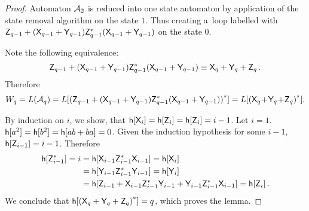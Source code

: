 \begin{proof}
    Automaton ${\mathcal{A}}_2$ is reduced into one state automaton by application of the state removal algorithm on the state $1$. Thus creating a~loop labelled with ${\mathsf{Z}}_{q-1} + ({\mathsf{X}}_{q-1} + {\mathsf{Y}}_{q-1}){\mathsf{Z}}_{q-1}^*({\mathsf{X}}_{q-1} + {\mathsf{Y}}_{q-1})$ on the state $0$.

    Note the following equivalence:
    \[
        {\mathsf{Z}}_{q-1} + ({\mathsf{X}}_{q-1} + {\mathsf{Y}}_{q-1}){\mathsf{Z}}_{q-1}^*({\mathsf{X}}_{q-1} + {\mathsf{Y}}_{q-1}) \equiv {\mathsf{X}}_q + {\mathsf{Y}}_q + {\mathsf{Z}}_q \, . \\
    \]
    Therefore
    \[
        W_q = L({\mathcal{A}}_q) = L[{({\mathsf{Z}}_{q-1} + ({\mathsf{X}}_{q-1} + {\mathsf{Y}}_{q-1}){\mathsf{Z}}_{q-1}^*({\mathsf{X}}_{q-1} + {\mathsf{Y}}_{q-1}))}^*] = L[{({\mathsf{X}}_q \! + \! {\mathsf{Y}}_q \! + \! {\mathsf{Z}}_q)}^*].
    \]

    By induction on $i$, we show, that ${\mathsf{h}[{\mathsf{X}}_i]} = {\mathsf{h}[{\mathsf{Z}}_i]} = {\mathsf{h}[{\mathsf{Z}}_i]} = i-1$. Let $i=1$. ${\mathsf{h}[a^2]} = {\mathsf{h}[b^2]} = {\mathsf{h}[ab+ba]} = 0$. Given the induction hypothesis for some $i - 1$,
    ${\mathsf{h}[{\mathsf{Z}}_{i-1}]} = i-1$. Therefore
    \begin{align*}
        {\mathsf{h}[{\mathsf{Z}}_{i-1}^*]} = i &= {\mathsf{h}[{\mathsf{X}}_{i-1} {\mathsf{Z}}_{i-1}^* {\mathsf{X}}_{i-1}]} = {\mathsf{h}[{\mathsf{X}}_i]} \\
        &= {\mathsf{h}[{\mathsf{Y}}_{i-1} {\mathsf{Z}}_{i-1}^* {\mathsf{Y}}_{i-1}]} = {\mathsf{h}[{\mathsf{Y}}_i]} \\
        &= {\mathsf{h}[{\mathsf{Z}}_{i-1} + {\mathsf{X}}_{i-1} {\mathsf{Z}}_{i-1}^* {\mathsf{Y}}_{i-1} + {\mathsf{Y}}_{i-1} {\mathsf{Z}}_{i-1}^* {\mathsf{X}}_{i-1}]} = {\mathsf{h}[{\mathsf{Z}}_i]} \, .
    \end{align*}
    We conclude that ${\mathsf{h}[{({\mathsf{X}}_q + {\mathsf{Y}}_q + {\mathsf{Z}}_q)}^*]} = q$, which proves the lemma.
\end{proof}


